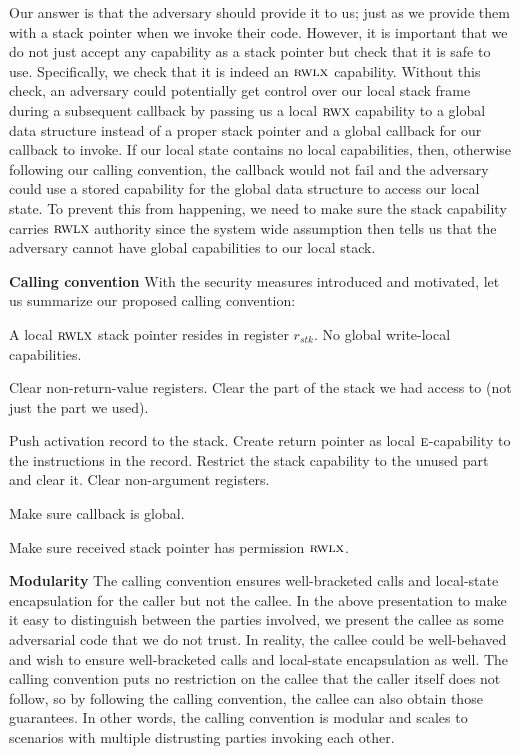 \documentclass[format=acmsmall, review=true, screen=true]{acmart}
\newcommand{\var}[1]{\mathit{#1}}
\newcommand{\stk}{\var{stk}}
\newcommand{\plainperm}[1]{\textsc{#1}}
\newcommand{\entry}{\plainperm{e}}
\newcommand{\rwx}{\plainperm{rwx}}
\newcommand{\rwlx}{\plainperm{rwlx}}
\newenvironment{toplas}%
    {\color{OliveGreen}}{}
\newcommand{\itoplassug}[1]{}
\begin{document}
Our answer is that the adversary should provide it to us; just as we provide
them with a stack pointer when we invoke their code. However, it is important
that we do not just accept any capability as a stack pointer but check that it
is safe to use. Specifically, we check that it is indeed an $\rwlx$ capability. Without
this check, an adversary could potentially get control over our local stack
frame during a subsequent callback by passing us a local $\rwx$ capability to a global data
structure instead of a proper stack pointer
and a global callback for our callback to invoke. If our local state contains no
local capabilities, then, otherwise following our calling convention, the callback would
not fail and the adversary could use a stored capability for the global data
structure to access our local state. To prevent this from happening, we need to
make sure the stack capability carries $\rwlx$ authority since the system wide assumption then
tells us that the adversary cannot have global capabilities to our local stack.

\textbf{Calling convention} With the security measures introduced and motivated,
let us summarize our proposed calling convention:
\begin{description}[font=\normalfont\itshape]
\item[At program start-up] A
local $\rwlx$ stack pointer resides in register $r_\stk$. No global write-local capabilities.
\item[Before returning to the adversary] Clear non-return-value
registers. Clear the part of the stack we had access to (not just the part we used).
\item[Before invoking the adversary] Push activation record to the
stack. Create return pointer as local $\entry$-capability to the instructions in
the record.  Restrict the stack capability to the unused part and clear
it. Clear non-argument registers.
\item[Before invoking an adversary callback] Make sure callback is global.
  \item[When invoked by an adversary] Make sure received stack pointer has permission $\rwlx$.
\end{description}

\begin{toplas}
  \textbf{Modularity} The calling convention ensures well-bracketed calls and
  local-state encapsulation for the caller but not the callee. In the above
  presentation to make it easy to distinguish between the parties involved, we
  present the callee as some adversarial code that we do not trust. In reality,
  the callee could be well-behaved and wish to ensure well-bracketed calls and
  local-state encapsulation as well. The calling convention puts no restriction
  on the callee that the caller itself does not follow, so by following the
  calling convention, the callee can also obtain those guarantees. In other
  words, the calling convention is modular and scales to scenarios with multiple
  distrusting parties invoking each other.
\end{toplas}
\end{document}
